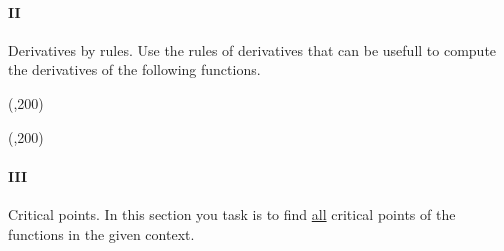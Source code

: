 \newpage

\paragraph{II} Derivatives by rules.
Use the rules of derivatives that can be usefull to compute the derivatives of the following functions. 

\begin{preguntas}


\begin{center}
    \framebox(\textwidth,200){} 
\end{center}


\begin{center}
    \framebox(\textwidth,200){} 
\end{center}

\end{preguntas}

\newpage

\paragraph{III} Critical points.
In this section you task is to find \underline{all} critical points of the functions in the given context.

